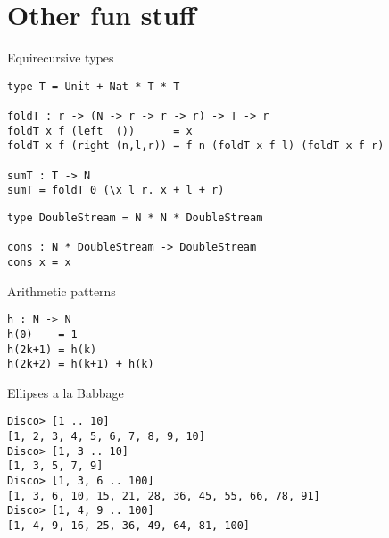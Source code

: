 \documentclass[xcolor=svgnames,12pt,aspectratio=169]{beamer}
\newenvironment{xframe}[1][]
  {\begin{frame}[fragile,environment=xframe,#1]}
  {\end{frame}}
\begin{document}
\section{Other fun stuff}

\begin{xframe}{Equirecursive types}
  \begin{overprint}

\begin{verbatim}
type T = Unit + Nat * T * T

foldT : r -> (N -> r -> r -> r) -> T -> r
foldT x f (left  ())      = x
foldT x f (right (n,l,r)) = f n (foldT x f l) (foldT x f r)

sumT : T -> N
sumT = foldT 0 (\x l r. x + l + r)
\end{verbatim}

\begin{verbatim}
type DoubleStream = N * N * DoubleStream

cons : N * DoubleStream -> DoubleStream
cons x = x
\end{verbatim}
  \end{overprint}
\end{xframe}

\begin{xframe}{Arithmetic patterns}
\begin{verbatim}
h : N -> N
h(0)    = 1
h(2k+1) = h(k)
h(2k+2) = h(k+1) + h(k)
\end{verbatim}
\end{xframe}

\begin{xframe}{Ellipses a la Babbage}
\begin{verbatim}
Disco> [1 .. 10]
[1, 2, 3, 4, 5, 6, 7, 8, 9, 10]
Disco> [1, 3 .. 10]
[1, 3, 5, 7, 9]
Disco> [1, 3, 6 .. 100]
[1, 3, 6, 10, 15, 21, 28, 36, 45, 55, 66, 78, 91]
Disco> [1, 4, 9 .. 100]
[1, 4, 9, 16, 25, 36, 49, 64, 81, 100]
\end{verbatim}
\end{xframe}
\end{document}
